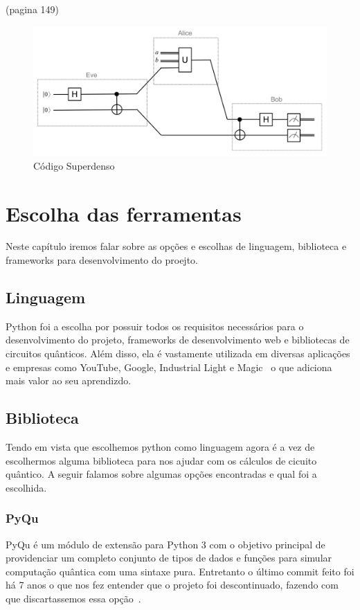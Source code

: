 \documentclass[a4paper, 12pt, oneside]{book}
\begin{document}
(pagina 149)
\begin{figure}[hbtp]
\centering
\includegraphics[scale=0.36]{superdenso.jpg}
\caption{Código Superdenso}
\end{figure}


\chapter{Escolha das ferramentas}
\thispagestyle{empty} 


Neste capítulo iremos falar sobre as opções e escolhas de linguagem, biblioteca e frameworks para desenvolvimento do proejto. 

\section{Linguagem}

Python foi a escolha por possuir todos os requisitos necessários para o desenvolvimento do projeto, frameworks de desenvolvimento web e bibliotecas de circuitos quânticos. Além disso, ela é vastamente utilizada em diversas aplicações e empresas como YouTube, Google, Industrial Light e Magic~\cite{pythonquotes} o que adiciona mais valor ao seu aprendizdo.

\section{Biblioteca}

Tendo em vista que escolhemos python como linguagem agora é a vez de escolhermos alguma biblioteca para nos ajudar com os cálculos de cicuito quântico. A seguir falamos sobre algumas opções encontradas e qual foi a escolhida.
\subsection{PyQu}
PyQu é um módulo de extensão para Python 3 com o objetivo principal de providenciar um completo conjunto de tipos de dados e funções para simular computação quântica com uma sintaxe pura. Entretanto o último commit feito foi há 7 anos o que nos fez entender que o projeto foi descontinuado, fazendo com que discartassemos essa opção~\cite{pyqu}.
\end{document}
